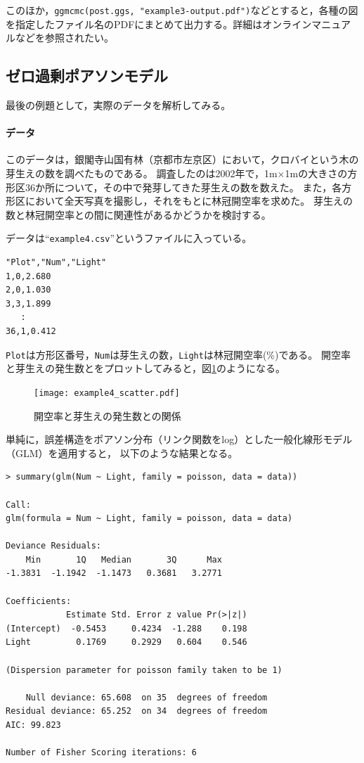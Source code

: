 \documentclass[11pt,uplatex]{jsarticle}
\begin{document}
このほか，\texttt{ggmcmc(post.ggs, "example3-output.pdf")}などとすると，各種の図を指定したファイル名のPDFにまとめて出力する。詳細はオンラインマニュアルなどを参照されたい。

\subsection{ゼロ過剰ポアソンモデル}
\label{path}

最後の例題として，実際のデータを解析してみる。

\paragraph{データ}
このデータは，銀閣寺山国有林（京都市左京区）において，クロバイという木の芽生えの数を調べたものである。
調査したのは2002年で，1m×1mの大きさの方形区36か所について，その中で発芽してきた芽生えの数を数えた。
また，各方形区において全天写真を撮影し，それをもとに林冠開空率を求めた。
芽生えの数と林冠開空率との間に関連性があるかどうかを検討する。

データは``\texttt{example4.csv}''というファイルに入っている。
\begin{lstlisting}
"Plot","Num","Light"
1,0,2.680
2,0,1.030
3,3,1.899
   :
36,1,0.412
\end{lstlisting}
\noindent
\texttt{Plot}は方形区番号，\texttt{Num}は芽生えの数，\texttt{Light}は林冠開空率(\%)である。
開空率と芽生えの発生数とをプロットしてみると，図\ref{example4_scatter}のようになる。

\begin{figure}[hbtp]
  \begin{center}
    \texttt{[image: example4\_scatter.pdf]}
  \end{center}
  \caption{開空率と芽生えの発生数との関係}
  \label{example4_scatter}
\end{figure}

単純に，誤差構造をポアソン分布（リンク関数をlog）とした一般化線形モデル（GLM）を適用すると，
以下のような結果となる。

\begin{lstlisting}
> summary(glm(Num ~ Light, family = poisson, data = data))

Call:
glm(formula = Num ~ Light, family = poisson, data = data)

Deviance Residuals: 
    Min       1Q   Median       3Q      Max  
-1.3831  -1.1942  -1.1473   0.3681   3.2771  

Coefficients:
            Estimate Std. Error z value Pr(>|z|)
(Intercept)  -0.5453     0.4234  -1.288    0.198
Light         0.1769     0.2929   0.604    0.546

(Dispersion parameter for poisson family taken to be 1)

    Null deviance: 65.608  on 35  degrees of freedom
Residual deviance: 65.252  on 34  degrees of freedom
AIC: 99.823

Number of Fisher Scoring iterations: 6
\end{lstlisting}
\end{document}
